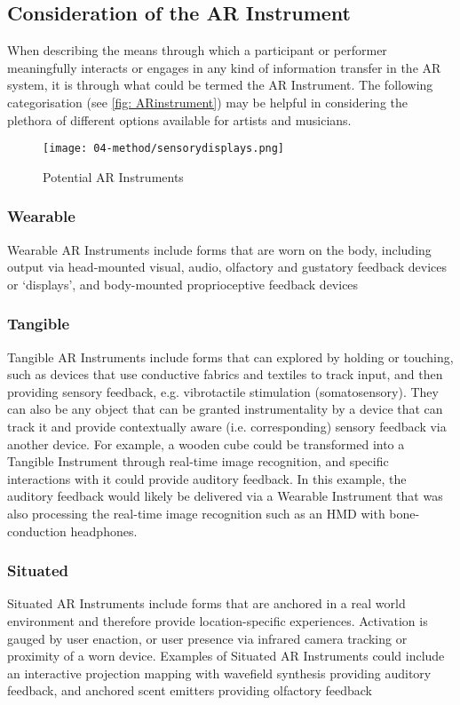 \subsection{Consideration of the AR Instrument} \label{sec: discussion-patterns-instrument}
When describing the means through which a participant or performer meaningfully interacts or engages in any kind of information transfer in the AR system, it is through what could be termed the AR Instrument. The following categorisation (see \autoref{fig: ARinstrument}) may be helpful in considering the plethora of different options available for artists and musicians.
\begin{figure}
    \centering
    {\texttt{[image: 04-method/sensorydisplays.png]}}
    \caption[Potential AR Instruments]{Potential AR Instruments}
\end{figure}\label{fig: ARinstrument}

\subsubsection{Wearable}
Wearable AR Instruments include forms that are worn on the body, including output via head-mounted visual, audio, olfactory and gustatory feedback devices or `displays', and body-mounted proprioceptive feedback devices

\subsubsection{Tangible}
Tangible AR Instruments include forms that can explored by holding or touching, such as devices that use conductive fabrics and textiles to track input, and then providing sensory feedback, e.g. vibrotactile stimulation (somatosensory). They can also be any object that can be granted instrumentality by a device that can track it and provide contextually aware (i.e. corresponding) sensory feedback via another device. For example, a wooden cube could be transformed into a Tangible Instrument through real-time image recognition, and specific interactions with it could provide auditory feedback. In this example, the auditory feedback would likely be delivered via a Wearable Instrument that was also processing the real-time image recognition such as an HMD with bone-conduction headphones.

\subsubsection{Situated}
Situated AR Instruments include forms that are anchored in a real world environment and therefore provide location-specific experiences. Activation is gauged by user enaction, or user presence via infrared camera tracking or proximity of a worn device. Examples of Situated AR Instruments could include an interactive projection mapping with wavefield synthesis providing auditory feedback, and anchored scent emitters providing olfactory feedback


